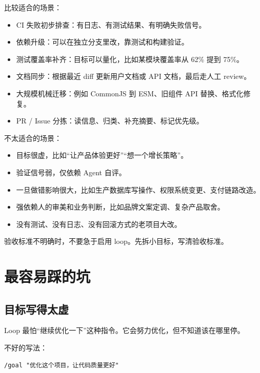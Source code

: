 \documentclass[9pt,a4paper,twocolumn]{ctexart}
\begin{document}
比较适合的场景：


\begin{itemize}[itemsep=1pt, topsep=2pt]
  \item CI 失败初步排查：有日志、有测试结果、有明确失败信号。
  \item 依赖升级：可以在独立分支里改，靠测试和构建验证。
  \item 测试覆盖率补齐：目标可以量化，比如某模块覆盖率从 62\% 提到 75\%。
  \item 文档同步：根据最近 diff 更新用户文档或 API 文档，最后走人工 review。
  \item 大规模机械迁移：例如 CommonJS 到 ESM、旧组件 API 替换、格式化修复。
  \item PR / Issue 分拣：读信息、归类、补充摘要、标记优先级。
\end{itemize}


不太适合的场景：


\begin{itemize}[itemsep=1pt, topsep=2pt]
  \item 目标很虚，比如“让产品体验更好”“想一个增长策略”。
  \item 验证信号弱，仅依赖 Agent 自评。
  \item 一旦做错影响很大，比如生产数据库写操作、权限系统变更、支付链路改造。
  \item 强依赖人的审美和业务判断，比如品牌文案定调、复杂产品取舍。
  \item 没有测试、没有日志、没有回滚方式的老项目大改。
\end{itemize}


验收标准不明确时，不要急于启用 loop。先拆小目标，写清验收标准。



\section*{最容易踩的坑}


\subsection*{目标写得太虚}


Loop 最怕“继续优化一下”这种指令。它会努力优化，但不知道该在哪里停。



不好的写法：



\begin{lstlisting}
/goal "优化这个项目，让代码质量更好"
\end{lstlisting}
\end{document}
